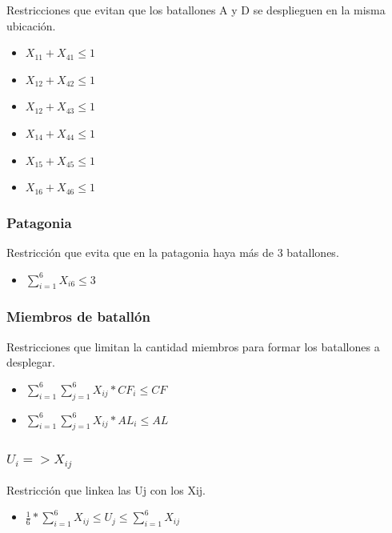 \documentclass[12pt]{article}
\begin{document}
Restricciones que evitan que los batallones A y D se desplieguen en la misma ubicación.

\begin{itemize}
    \item $X_{11} + X_{41} \leq 1$
    \item $X_{12} + X_{42} \leq 1$
    \item $X_{12} + X_{43} \leq 1$
    \item $X_{14} + X_{44} \leq 1$
    \item $X_{15} + X_{45} \leq 1$
    \item $X_{16} + X_{46} \leq 1$
\end{itemize}

\subsubsection{Patagonia}

Restricción que evita que en la patagonia haya más de 3 batallones.

\begin{itemize}
    \item $\sum_{i=1}^{6} X_{i6} \leq 3$
\end{itemize}

\subsubsection{Miembros de batallón}

Restricciones que limitan la cantidad miembros para formar los batallones a desplegar.

\begin{itemize}
    \item $ \sum_{i=1}^{6}\sum_{j=1}^{6} X_{ij} * CF_{i} \leq CF$
    \item $ \sum_{i=1}^{6}\sum_{j=1}^{6} X_{ij} * AL_{i} \leq AL$
\end{itemize}

\subsubsection{$U_{i} => X_{ij}$}

Restricción que linkea las Uj con los Xij.

\begin{itemize}
    \item $ \frac{1}{6} * \sum_{i=1}^{6} X_{ij} \leq U_{j} \leq \sum_{i=1}^{6} X_{ij}$
\end{itemize}
\end{document}

